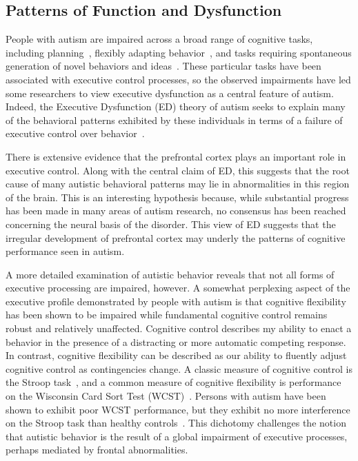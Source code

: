 %
%

\subsection{Patterns of Function and Dysfunction}
People with autism are impaired across a
broad range of cognitive tasks, including
planning~\cite{BennettoL:1996:AutismPlanningWCST}, flexibly adapting
behavior~\cite{BennettoL:1996:AutismPlanningWCST,Ozonoff:1999:AutismStroopWCST},
and tasks requiring spontaneous generation of novel behaviors and
ideas~\cite{TurnerW:1999:AutismGenerativity}.  These particular tasks have
been associated with executive control processes, so the observed
impairments have led some researchers to view executive dysfunction as
a central feature of autism.  Indeed, the Executive Dysfunction (ED)
theory of autism seeks to explain many of the behavioral patterns
exhibited by these individuals in terms of a failure of executive
control over behavior~\cite{HughesC:1994:AutismExecutiveDysfunction}.

There is extensive evidence that the prefrontal cortex plays an
important role in executive control.  Along with the central claim of
ED, this suggests that the root cause of many autistic behavioral
patterns may lie in abnormalities in this region of the brain.  This
is an interesting hypothesis because, while substantial progress has
been made in many areas of autism research, no consensus has been
reached concerning the neural basis of the disorder.  This view of ED
suggests that the irregular development of prefrontal cortex may
underly the patterns of cognitive performance seen in autism.

A more detailed examination of autistic behavior reveals that not all
forms of executive processing are impaired, however.  A somewhat
perplexing aspect of the executive profile demonstrated by people with
autism is that cognitive flexibility has been shown to be impaired
while fundamental cognitive control remains robust and relatively
unaffected.  Cognitive control describes my ability to enact a
behavior in the presence of a distracting or more automatic competing
response.  In contrast, cognitive flexibility can be described as our
ability to fluently adjust cognitive control as contingencies change.
A classic measure of cognitive control is the Stroop
task~\cite{StroopJR:1935:Interference}, and a common measure of
cognitive flexibility is performance on the Wisconsin Card Sort Test
(WCST)~\cite{BergEA:1948:WCST}.  Persons with autism have been shown
to exhibit poor WCST performance, but they exhibit no more
interference on the Stroop task than healthy
controls~\cite{Ozonoff:1999:AutismStroopWCST}.  This dichotomy
challenges the notion that autistic behavior is the result of a global
impairment of executive processes, perhaps mediated by frontal
abnormalities.

